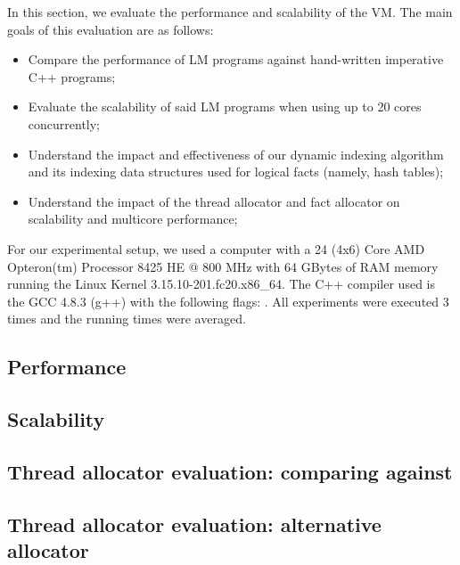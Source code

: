 In this section, we evaluate the performance and scalability of the VM. The main
goals of this evaluation are as follows:

\begin{itemize}
   \item Compare the performance of LM programs against hand-written
      imperative C++ programs;
   \item Evaluate the scalability of said LM programs when using up to 20 cores
      concurrently;
   \item Understand the impact and effectiveness of our dynamic indexing
      algorithm and its indexing data structures used for logical facts (namely,
      hash tables);
   \item Understand the impact of the thread allocator and fact allocator on scalability and
      multicore performance;
\end{itemize}

For our experimental setup, we used a computer with a 24 (4x6) Core AMD
Opteron(tm) Processor 8425 HE $@$ 800 MHz with 64 GBytes of RAM memory running
the Linux Kernel 3.15.10-201.fc20.x86\_64. The C++ compiler used is the GCC
4.8.3 (g++) with the following  flags: .  All experiments were executed 3 times and the running times
were averaged.

\subsection{Performance}\label{section:implementation:performance}


\subsection{Scalability}


\clearpage

\subsection{Thread allocator evaluation: comparing against }


\subsection{Thread allocator evaluation: alternative allocator}\label{section:implementation:alternative_allocator}

